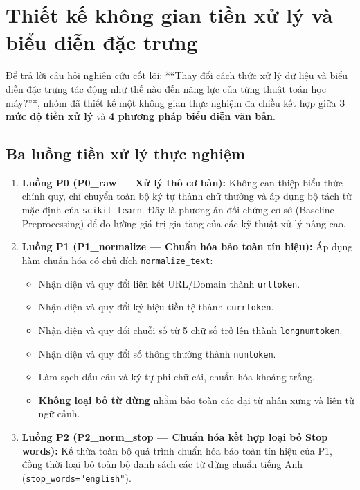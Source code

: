\section{Thiết kế không gian tiền xử lý và biểu diễn đặc trưng}
\label{sec:thiet-ke-khong-gian}

Để trả lời câu hỏi nghiên cứu cốt lõi: *“Thay đổi cách thức xử lý dữ liệu và biểu diễn đặc trưng tác động như thế nào đến năng lực của từng thuật toán học máy?”*, nhóm đã thiết kế một không gian thực nghiệm đa chiều kết hợp giữa \textbf{3 mức độ tiền xử lý} và \textbf{4 phương pháp biểu diễn văn bản}.

\subsection{Ba luồng tiền xử lý thực nghiệm}
\begin{enumerate}
    \item \textbf{Luồng P0 (P0\_raw --- Xử lý thô cơ bản):}
    Không can thiệp biểu thức chính quy, chỉ chuyển toàn bộ ký tự thành chữ thường và áp dụng bộ tách từ mặc định của \texttt{scikit-learn}. Đây là phương án đối chứng cơ sở (Baseline Preprocessing) để đo lường giá trị gia tăng của các kỹ thuật xử lý nâng cao.
    \item \textbf{Luồng P1 (P1\_normalize --- Chuẩn hóa bảo toàn tín hiệu):}
    Áp dụng hàm chuẩn hóa có chủ đích \texttt{normalize\_text}:
    \begin{itemize}
        \item Nhận diện và quy đổi liên kết URL/Domain thành \texttt{urltoken}.
        \item Nhận diện và quy đổi ký hiệu tiền tệ thành \texttt{currtoken}.
        \item Nhận diện và quy đổi chuỗi số từ 5 chữ số trở lên thành \texttt{longnumtoken}.
        \item Nhận diện và quy đổi số thông thường thành \texttt{numtoken}.
        \item Làm sạch dấu câu và ký tự phi chữ cái, chuẩn hóa khoảng trắng.
        \item \textbf{Không loại bỏ từ dừng} nhằm bảo toàn các đại từ nhân xưng và liên từ ngữ cảnh.
    \end{itemize}
    \item \textbf{Luồng P2 (P2\_norm\_stop --- Chuẩn hóa kết hợp loại bỏ Stop words):}
    Kế thừa toàn bộ quá trình chuẩn hóa bảo toàn tín hiệu của P1, đồng thời loại bỏ toàn bộ danh sách các từ dừng chuẩn tiếng Anh (\texttt{stop\_words="english"}).
\end{enumerate}

